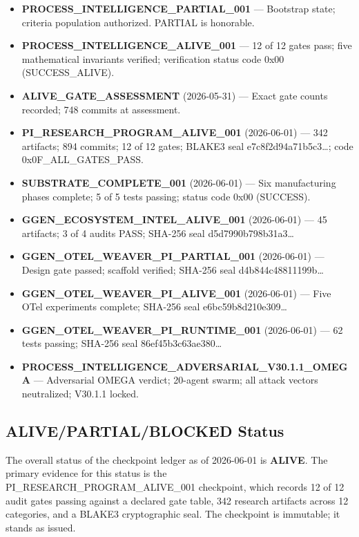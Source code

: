\begin{itemize}
  \item \textbf{PROCESS\_INTELLIGENCE\_PARTIAL\_001} --- Bootstrap state; criteria population
        authorized. PARTIAL is honorable.
  \item \textbf{PROCESS\_INTELLIGENCE\_ALIVE\_001} --- 12 of 12 gates pass; five mathematical
        invariants verified; verification status code 0x00 (SUCCESS\_ALIVE).
  \item \textbf{ALIVE\_GATE\_ASSESSMENT} (2026-05-31) --- Exact gate counts recorded; 748 commits
        at assessment.
  \item \textbf{PI\_RESEARCH\_PROGRAM\_ALIVE\_001} (2026-06-01) --- 342 artifacts; 894 commits;
        12 of 12 gates; BLAKE3 seal e7c8f2d94a71b5c3\ldots; code 0x0F\_ALL\_GATES\_PASS.
  \item \textbf{SUBSTRATE\_COMPLETE\_001} (2026-06-01) --- Six manufacturing phases complete;
        5 of 5 tests passing; status code 0x00 (SUCCESS).
  \item \textbf{GGEN\_ECOSYSTEM\_INTEL\_ALIVE\_001} (2026-06-01) --- 45 artifacts; 3 of 4 audits
        PASS; SHA-256 seal d5d7990b798b31a3\ldots
  \item \textbf{GGEN\_OTEL\_WEAVER\_PI\_PARTIAL\_001} (2026-06-01) --- Design gate passed; scaffold
        verified; SHA-256 seal d4b844c48811199b\ldots
  \item \textbf{GGEN\_OTEL\_WEAVER\_PI\_ALIVE\_001} (2026-06-01) --- Five OTel experiments complete;
        SHA-256 seal e6bc59b8d210e309\ldots
  \item \textbf{GGEN\_OTEL\_WEAVER\_PI\_RUNTIME\_001} (2026-06-01) --- 62 tests passing; SHA-256
        seal 86ef45b3c63ae380\ldots
  \item \textbf{PROCESS\_INTELLIGENCE\_ADVERSARIAL\_V30.1.1\_OMEGA} --- Adversarial OMEGA verdict;
        20-agent swarm; all attack vectors neutralized; V30.1.1 locked.
\end{itemize}

\subsection{ALIVE/PARTIAL/BLOCKED Status}
\label{sec:checkpoints-evidence-status}

The overall status of the checkpoint ledger as of 2026-06-01 is \textbf{ALIVE}. The primary evidence
for this status is the PI\_RESEARCH\_PROGRAM\_ALIVE\_001 checkpoint, which records 12 of 12 audit
gates passing against a declared gate table, 342 research artifacts across 12 categories, and a
BLAKE3 cryptographic seal. The checkpoint is immutable; it stands as issued.

